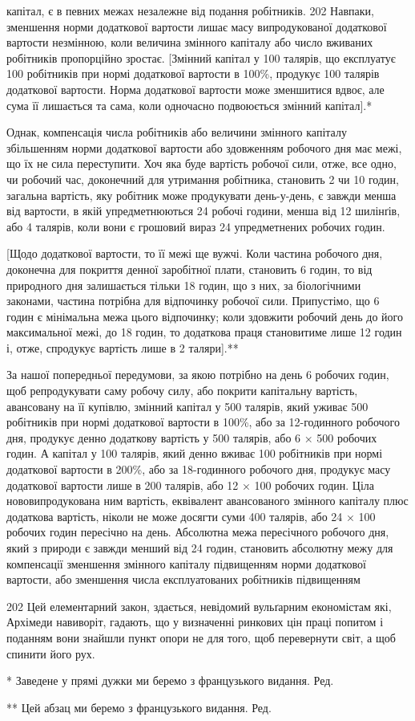 капітал, є в певних межах незалежне від подання робітників. 202
Навпаки, зменшення норми додаткової вартости лишає масу
випродукованої додаткової вартости незмінною, коли величина
змінного капіталу або число вживаних робітників пропорційно
зростає. [Змінний капітал у 100 талярів, що експлуатує 100 робітників
при нормі додаткової вартости в 100\%, продукує 100 талярів
додаткової вартости. Норма додаткової вартости може зменшитися
вдвоє, але сума її лишається та сама, коли одночасно
подвоюється змінний капітал].*

Однак, компенсація числа робітників або величини змінного
капіталу збільшенням норми додаткової вартости або здовженням
робочого дня має межі, що їх не сила переступити. Хоч яка
буде вартість робочої сили, отже, все одно, чи робочий час,
доконечний для утримання робітника, становить 2 чи 10 годин,
загальна вартість, яку робітник може продукувати день-у-день,
є завжди менша від вартости, в якій упредметнюються 24 робочі
години, менша від 12 шилінґів, або 4 талярів, коли вони є грошовий
вираз 24 упредметнених робочих годин.

[Щодо додаткової вартости, то її межі ще вужчі. Коли частина
робочого дня, доконечна для покриття денної заробітної плати,
становить 6 годин, то від природного дня залишається тільки 18 годин,
що з них, за біологічними законами, частина потрібна для
відпочинку робочої сили. Припустімо, що 6 годин є мінімальна
межа цього відпочинку; коли здовжити робочий день до його максимальної
межі, до 18 годин, то додаткова праця становитиме
лише 12 годин і, отже, спродукує вартість лише в 2 таляри].**

За нашої попередньої передумови, за якою потрібно на день
6 робочих годин, щоб репродукувати саму робочу силу, або
покрити капітальну вартість, авансовану на її купівлю, змінний
капітал у 500 талярів, який уживає 500 робітників при нормі
додаткової вартости в 100\%, або за 12-годинного робочого дня,
продукує денно додаткову вартість у 500 талярів, або 6 × 500
робочих годин. А капітал у 100 талярів, який денно вживає
100 робітників при нормі додаткової вартости в 200\%, або за 18-годинного
робочого дня, продукує масу додаткової вартости лише
в 200 талярів, або 12 × 100 робочих годин. Ціла нововипродукована
ним вартість, еквівалент авансованого змінного капіталу
плюс додаткова вартість, ніколи не може досягти суми 400 талярів,
або 24 × 100 робочих годин пересічно на день. Абсолютна
межа пересічного робочого дня, який з природи є завжди менший
від 24 годин, становить абсолютну межу для компенсації зменшення
змінного капіталу підвищенням норми додаткової вартости,
або зменшення числа експлуатованих робітників підвищенням

202 Цей елементарний закон, здається, невідомий вульґарним економістам
які, Архімеди навиворіт, гадають, що у визначенні ринкових цін
праці попитом і поданням вони знайшли пункт опори не для того, щоб
перевернути світ, а щоб спинити його рух.

* Заведене у прямі дужки ми беремо з французького видання. Ред.

** Цей абзац ми беремо з французького видання. Ред.
